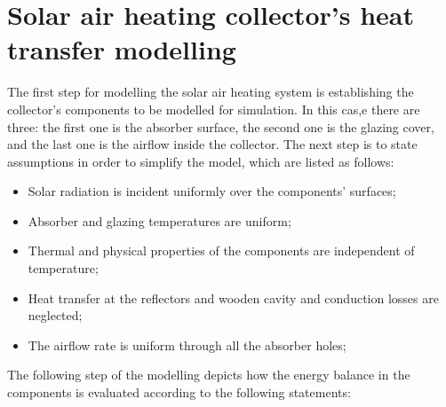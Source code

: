 
\section{Solar air heating collector's heat transfer modelling}

The first step for modelling the solar air heating system is establishing the collector's components to be modelled for simulation. In this cas,e there are three: the first one is the absorber surface, the second one is the glazing cover, and the last one is the airflow inside the collector. The next step is to state assumptions in order to simplify the model, which are listed as follows:

\begin{itemize}
	\item Solar radiation is incident uniformly over the components' surfaces;
	\item Absorber and glazing temperatures are uniform;
	\item Thermal and physical properties of the components are independent of temperature;
	\item Heat transfer at the reflectors and wooden cavity and conduction losses are neglected;
	\item The airflow rate is uniform through all the absorber holes;
\end{itemize}

The following step of the modelling depicts how the energy balance in the components is evaluated according to the following statements:

